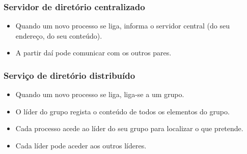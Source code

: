 \documentclass{article}
\begin{document}
\subsubsection{Servidor de diretório centralizado}

\begin{itemize}
	\item Quando um novo processo se liga, informa o servidor central (do seu endereço, do seu conteúdo).
	\item A partir daí pode comunicar com os outros pares.
\end{itemize}	

\subsubsection{Serviço de diretório distribuído}

\begin{itemize}
	\item Quando um novo processo se liga, liga-se a um grupo.
	\item O líder do grupo regista o conteúdo de todos os elementos do grupo.
	\item Cada processo acede ao líder do seu grupo para localizar o que pretende.
	\item Cada líder pode aceder aos outros líderes.
\end{itemize}
\end{document}
